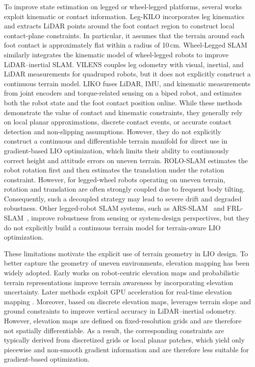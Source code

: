 \documentclass[journal,twoside,web]{ieeecolor}
\begin{document}
To improve state estimation on legged or wheel-legged platforms, several works exploit kinematic or contact information. Leg-KILO \cite{leg-kilo} incorporates leg kinematics and extracts LiDAR points around the foot contact region to construct local contact-plane constraints. In particular, it assumes that the terrain around each foot contact is approximately flat within a radius of 10\,cm. Wheel-Legged SLAM \cite{wl-slam} similarly integrates the kinematic model of wheel-legged robots to improve LiDAR--inertial SLAM. VILENS \cite{vilen} couples leg odometry with visual, inertial, and LiDAR measurements for quadruped robots, but it does not explicitly construct a continuous terrain model. LIKO \cite{liko} fuses LiDAR, IMU, and kinematic measurements from joint encoders and torque-related sensing on a biped robot, and estimates both the robot state and the foot contact position online. While these methods demonstrate the value of contact and kinematic constraints, they generally rely on local planar approximations, discrete contact events, or accurate contact detection and non-slipping assumptions. However, they do not explicitly construct a continuous and differentiable terrain manifold for direct use in gradient-based LIO optimization, which limits their ability to continuously correct height and attitude errors on uneven terrain.
ROLO-SLAM \cite{roloslam} estimates the robot rotation first and then estimates the translation under the rotation constraint. However, for legged-wheel robots operating on uneven terrain, rotation and translation are often strongly coupled due to frequent body tilting. Consequently, such a decoupled strategy may lead to severe drift and degraded robustness. Other legged-robot SLAM systems, such as ARS-SLAM~\cite{ars-slam} and FRL-SLAM~\cite{frl-slam}, improve robustness from sensing or system-design perspectives, but they do not explicitly build a continuous terrain model for terrain-aware LIO optimization.

These limitations motivate the explicit use of terrain geometry in LIO design. To better capture the geometry of uneven environments, elevation mapping has been widely adopted. Early works on robot-centric elevation maps \cite{elevation_map_2014} and probabilistic terrain representations \cite{elevation_map_2018} improve terrain awareness by incorporating elevation uncertainty. Later methods exploit GPU acceleration for real-time elevation mapping \cite{elevation_map_gpu}. Moreover, based on discrete elevation maps, \cite{lio_gc} leverages terrain slope and ground constraints to improve vertical accuracy in LiDAR--inertial odometry. However, elevation maps are defined on fixed-resolution grids and are therefore not spatially differentiable. As a result, the corresponding constraints are typically derived from discretized grids or local planar patches, which yield only piecewise and non-smooth gradient information and are therefore less suitable for gradient-based optimization.
\end{document}
